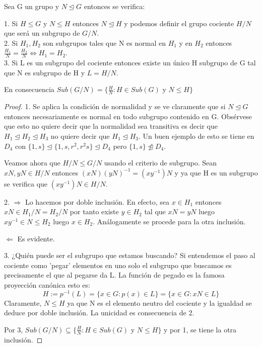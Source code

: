 \begin{proposition}
Sea G un grupo y $N \unlhd G$ entonces se verifica:

1. Si $H \le G$ y $N \le H$ entonces $N \unlhd H$ y podemos definir el grupo cociente $H/N$ que será un subgrupo de $G/N$.\\
2. Si $H_1,H_2$ son subgrupos tales que N es normal en $H_1$ y en $H_2$ entonces $\frac{H_1}{N} = \frac{H_2}{N} \iff H_1 = H_2$. \\
3. Si L es un subgrupo del cociente entonces existe un único H subgrupo de G tal que N es subgrupo de H y $L = H/N$.

En consecuencia $Sub(G/N) = \{\frac{H}{N}:H \in Sub(G)$ y $N \le H\}$
\end{proposition}
\begin{proof}
1. Se aplica la condición de normalidad y se ve claramente que si $N \unlhd G$ entonces necesariamente es normal en todo subgrupo contenido en G. Obsérvese que esto no quiere decir que la normalidad sea transitiva es decir que $H_1 \unlhd H_2 \unlhd H_3$ no quiere decir que $H_1 \unlhd H_3$. Un buen ejemplo de esto se tiene en $D_4$ con $\{1,s\} \unlhd \{1,s,r^2,r^2s\} \unlhd D_4$ pero $\{1,s\} \ntrianglelefteq D_4$.

Veamos ahora que $H/N \le G/N$ usando el criterio de subgrupo. Sean $xN,yN \in H/N$ entonces $(xN)(yN)^{-1} = (xy^{-1})N$ y ya que H es un subgrupo se verifica que $(xy^{-1})N \in H/N$.

2. $\Rightarrow$ Lo hacemos por doble inclusión. En efecto, sea $x \in H_1$ entonces $xN \in H_1/N = H_2/N$ por tanto existe $y \in H_2$ tal que $xN = yN$ luego $xy^{-1} \in N \le    H_2$ luego $x \in H_2$. Análogamente se procede para la otra inclusión.

$\Leftarrow$ Es evidente.

3. ¿Quién puede ser el subgrupo que estamos buscando? Si entendemos el paso al cociente como 'pegar' elementos en uno solo el subgrupo que buscamos es precisamente el que al pegarse da L. La función de pegado es la famosa proyección canónica esto es: $$H:=p^{-1}(L) = \{x \in G : p(x) \in L\} = \{x \in G:xN \in L\}$$ Claramente, $N \le H$ ya que N es el elemento neutro del cociente y la igualdad se deduce por doble inclusión. La unicidad es consecuencia de 2.

Por 3, $Sub(G/N) \subseteq \{\frac{H}{N}:H \in Sub(G)$ y $N \le H\}$ y por 1, se tiene la otra inclusión.
\end{proof}

